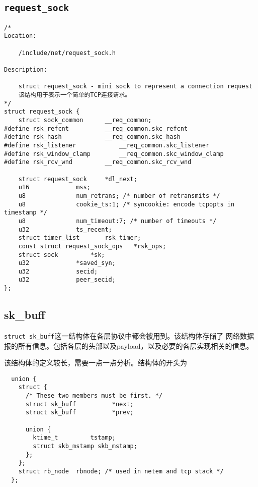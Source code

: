     \subsection{\texttt{request_sock}}

\begin{verbatim}
/* 
Location:

    /include/net/request_sock.h

Description:
    
    struct request_sock - mini sock to represent a connection request
    该结构用于表示一个简单的TCP连接请求。
*/
struct request_sock {
    struct sock_common      __req_common;
#define rsk_refcnt          __req_common.skc_refcnt
#define rsk_hash            __req_common.skc_hash
#define rsk_listener            __req_common.skc_listener
#define rsk_window_clamp        __req_common.skc_window_clamp
#define rsk_rcv_wnd         __req_common.skc_rcv_wnd

    struct request_sock     *dl_next;
    u16             mss;
    u8              num_retrans; /* number of retransmits */
    u8              cookie_ts:1; /* syncookie: encode tcpopts in timestamp */
    u8              num_timeout:7; /* number of timeouts */
    u32             ts_recent;
    struct timer_list       rsk_timer;
    const struct request_sock_ops   *rsk_ops;
    struct sock         *sk;
    u32             *saved_syn;
    u32             secid;
    u32             peer_secid;
};
\end{verbatim}

    \subsection{sk\_buff}
\label{sec:sk_buff}

\texttt{struct sk_buff}这一结构体在各层协议中都会被用到。该结构体存储了
网络数据报的所有信息。包括各层的头部以及payload，以及必要的各层实现相关的信息。

该结构体的定义较长，需要一点一点分析。结构体的开头为
\begin{verbatim}
  union {
    struct {
      /* These two members must be first. */
      struct sk_buff          *next;
      struct sk_buff          *prev;

      union {
        ktime_t         tstamp;
        struct skb_mstamp skb_mstamp;
      };
    };
    struct rb_node  rbnode; /* used in netem and tcp stack */
  };
\end{verbatim}

